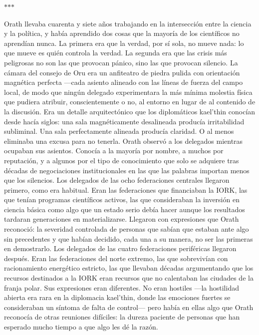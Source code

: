\documentclass[11pt,a5paper,twoside]{book}
\begin{document}
\vspace{1.5em}
\begin{center}$\ast$\quad$\ast$\quad$\ast$\end{center}
\vspace{1.5em}

Orath llevaba cuarenta y siete años trabajando en la intersección entre la ciencia y la política, y había aprendido dos cosas que la mayoría de los científicos no aprendían nunca. La primera era que la verdad, por sí sola, no mueve nada: lo que mueve es quién controla la verdad. La segunda era que las crisis más peligrosas no son las que provocan pánico, sino las que provocan silencio.
La cámara del consejo de Oru era un anfiteatro de piedra pulida con orientación magnética perfecta —cada asiento alineado con las líneas de fuerza del campo local, de modo que ningún delegado experimentara la más mínima molestia física que pudiera atribuir, conscientemente o no, al entorno en lugar de al contenido de la discusión. Era un detalle arquitectónico que los diplomáticos kael'thin conocían desde hacía siglos: una sala magnéticamente desalineada producía irritabilidad subliminal. Una sala perfectamente alineada producía claridad. O al menos eliminaba una excusa para no tenerla.
Orath observó a los delegados mientras ocupaban sus asientos. Conocía a la mayoría por nombre, a muchos por reputación, y a algunos por el tipo de conocimiento que solo se adquiere tras décadas de negociaciones institucionales en las que las palabras importan menos que los silencios.
Los delegados de las ocho federaciones centrales llegaron primero, como era habitual. Eran las federaciones que financiaban la IORK, las que tenían programas científicos activos, las que consideraban la inversión en ciencia básica como algo que un estado serio debía hacer aunque los resultados tardaran generaciones en materializarse. Llegaron con expresiones que Orath reconoció: la severidad controlada de personas que sabían que estaban ante algo sin precedentes y que habían decidido, cada una a su manera, no ser las primeras en demostrarlo.
Los delegados de las cuatro federaciones periféricas llegaron después. Eran las federaciones del norte extremo, las que sobrevivían con racionamiento energético estricto, las que llevaban décadas argumentando que los recursos destinados a la IORK eran recursos que no calentaban las ciudades de la franja polar. Sus expresiones eran diferentes. No eran hostiles —la hostilidad abierta era rara en la diplomacia kael'thin, donde las emociones fuertes se consideraban un síntoma de falta de control— pero había en ellas algo que Orath reconocía de otras reuniones difíciles: la dureza paciente de personas que han esperado mucho tiempo a que algo les dé la razón.
\end{document}

